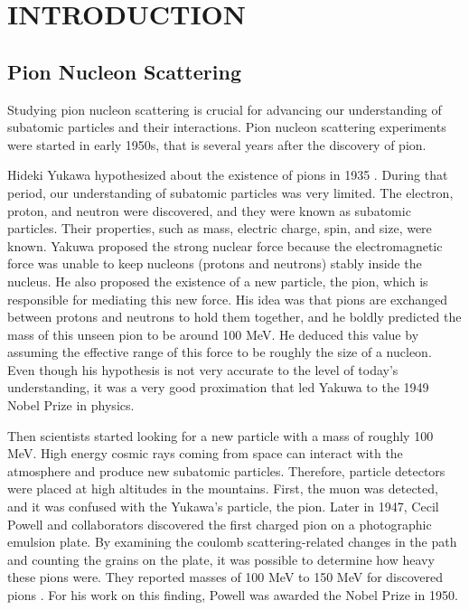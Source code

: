 \chapter{INTRODUCTION}



\section{Pion Nucleon Scattering}


Studying pion nucleon scattering is crucial for advancing our understanding of subatomic particles and their interactions. Pion nucleon scattering experiments were started in early 1950s, that is several years after the discovery of pion.

Hideki Yukawa hypothesized about the existence of pions in 1935 \cite{Yukawa:1935xg}. During that period, our understanding of subatomic particles was very limited. The electron, proton, and neutron were discovered, and they were known as subatomic particles. Their properties, such as mass, electric charge, spin, and size, were known. Yakuwa proposed the strong nuclear force because the electromagnetic force was unable to keep nucleons (protons and neutrons) stably inside the nucleus. He also proposed the existence of a new particle, the pion, which is responsible for mediating this new force. His idea was that pions are exchanged between protons and neutrons to hold them together, and he boldly predicted the mass of this unseen pion to be around 100 MeV. He deduced this value by assuming the effective range of this force to be roughly the size of a nucleon. Even though his hypothesis is not very accurate to the level of today's understanding, it was a very good proximation that led Yakuwa to the 1949 Nobel Prize in physics.

Then scientists started looking for a new particle with a mass of roughly 100 MeV. High energy cosmic rays coming from space can interact with the atmosphere and produce new subatomic particles. Therefore, particle detectors were placed at high altitudes in the mountains. First, the muon was detected, and it was confused with the Yukawa's particle, the pion. Later in 1947, Cecil Powell and collaborators discovered the first charged pion \cite{Lattes1947ProcessesIC} on a photographic emulsion plate. By examining the coulomb scattering-related changes in the path and counting the grains on the plate, it was possible to determine how heavy these pions were. They reported masses of 100 MeV to 150 MeV for discovered pions \cite{CFPowell_1950}. For his work on this finding, Powell was awarded the Nobel Prize in 1950.

